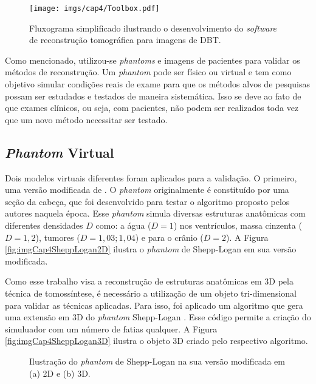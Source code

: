 \begin{figure}[H]
	\caption{Fluxograma simplificado ilustrando o desenvolvimento do \textit{software} de reconstrução tomográfica para imagens de \acs{DBT}.}
	\begin{center}
		\texttt{[image: imgs/cap4/Toolbox.pdf]}
	\end{center}
	\label{fig:imgCap4Toolbox}
\end{figure}

Como mencionado, utilizou-se \textit{phantoms} e imagens de pacientes para validar os métodos de reconstrução. Um \textit{phantom} pode ser físico ou virtual e tem como objetivo simular condições reais de exame para que os métodos alvos de pesquisas possam ser estudados e testados de maneira sistemática. Isso se deve ao fato de que exames clínicos, ou seja, com pacientes, não podem ser realizados toda vez que um novo método necessitar ser testado.

\subsection{\textit{Phantom} Virtual}

Dois modelos virtuais diferentes foram aplicados para a validação.  O primeiro, uma versão modificada de . O \textit{phantom} originalmente é constituído por uma seção da cabeça, que foi desenvolvido para testar o algoritmo proposto pelos autores naquela época. Esse \textit{phantom} simula diversas estruturas anatômicas com diferentes densidades $D$ como: a água ($D=1$) nos ventrículos, massa cinzenta ($D=1,2$), tumores ($D=1,03;1,04$) e para o crânio ($D=2$). A Figura \ref{fig:imgCap4SheppLogan2D} ilustra o \textit{phantom} de Shepp-Logan em sua versão modificada.

Como esse trabalho visa a reconstrução de estruturas anatômicas em \acs{3D} pela técnica de tomossíntese, é necessário a utilização de um objeto tri-dimensional para validar as técnicas aplicadas. Para isso, foi aplicado um algoritmo que gera uma extensão em \acs{3D} do \textit{phantom} Shepp-Logan \cite{Schabel2006}. Esse código permite a criação do simuluador com um número de fatias qualquer. A Figura \ref{fig:imgCap4SheppLogan3D} ilustra o objeto \acs{3D} criado pelo respectivo algoritmo.

\begin{figure}[H]
	\centering
	
	\caption{Ilustração do \textit{phantom} de Shepp-Logan na sua versão modificada em (a) \acs{2D} e (b) \acs{3D}.}
	
	\hfil
	
	\label{fig:imgCap4SheppLogan}
\end{figure}

